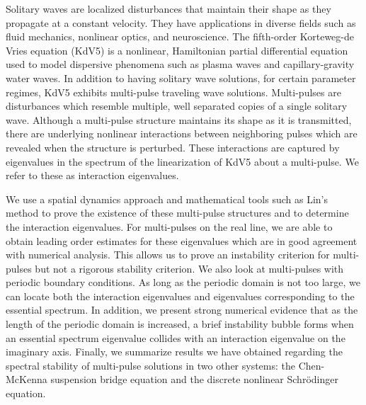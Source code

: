 \documentclass[thesis.tex]{subfiles}
\begin{document}
\thispagestyle{empty}


Solitary waves are localized disturbances that maintain their shape as they propagate at a constant velocity. They have applications in diverse fields such as fluid mechanics, nonlinear optics, and neuroscience. The fifth-order Korteweg-de Vries equation (KdV5) is a nonlinear, Hamiltonian partial differential equation used to model dispersive phenomena such as plasma waves and capillary-gravity water waves. In addition to having solitary wave solutions, for certain parameter regimes, KdV5 exhibits multi-pulse traveling wave solutions. Multi-pulses are disturbances which resemble multiple, well separated copies of a single solitary wave. Although a multi-pulse structure maintains its shape as it is transmitted, there are underlying nonlinear interactions between neighboring pulses which are revealed when the structure is perturbed. These interactions are captured by eigenvalues in the spectrum of the linearization of KdV5 about a multi-pulse. We refer to these as interaction eigenvalues.

\noindent We use a spatial dynamics approach and mathematical tools such as Lin's method to prove the existence of these multi-pulse structures and to determine the interaction eigenvalues. For multi-pulses on the real line, we are able to obtain leading order estimates for these eigenvalues which are in good agreement with numerical analysis. This allows us to prove an instability criterion for multi-pulses but not a rigorous stability criterion. We also look at multi-pulses with periodic boundary conditions. As long as the periodic domain is not too large, we can locate both the interaction eigenvalues and eigenvalues corresponding to the essential spectrum. In addition, we present strong numerical evidence that as the length of the periodic domain is increased, a brief instability bubble forms when an essential spectrum eigenvalue collides with an interaction eigenvalue on the imaginary axis. Finally, we summarize results we have obtained regarding the spectral stability of multi-pulse solutions in two other systems: the Chen-McKenna suspension bridge equation and the discrete nonlinear Schr{\"o}dinger equation.
\end{document}
